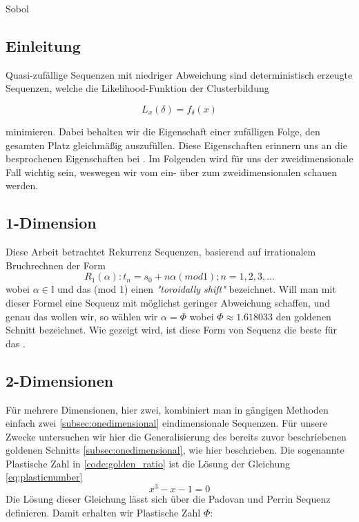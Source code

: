 Sobol \cite{owen1998scrambling} \cite{heitz:hal-02150657} \cite{quasirandomsequencesbyRoberts}

\subsection{Einleitung}
Quasi-zufällige Sequenzen mit niedriger Abweichung sind deterministisch 
erzeugte Sequenzen, welche die Likelihood-Funktion der Clusterbildung

\begin{equation}\label{eq:likelihood}
    L_{x}(\delta) = f_{\delta}(x)
\end{equation}

minimieren. Dabei behalten wir die Eigenschaft einer zufälligen Folge, 
den gesamten Platz gleichmäßig auszufüllen. Diese Eigenschaften erinnern
uns an die besprochenen Eigenschaften bei .
Im Folgenden wird für uns der zweidimensionale Fall wichtig sein, weswegen
wir vom ein- über zum zweidimensionalen schauen werden.

\label{subsec:onedimensional}
\subsection{1-Dimension}
Diese Arbeit betrachtet Rekurrenz Sequenzen, basierend auf irrationalem 
Bruchrechnen der Form
\begin{equation}\label{eq:RekurrenzSequenz}
    R_{1}(\alpha) : t_n = s_0 + n\alpha(mod 1); n = 1,2,3,...
\end{equation}
wobei $\alpha \in \mathbb{I}$ und das (mod 1) einen \textit{"toroidally shift"}
bezeichnet. Will man mit dieser Formel eine Sequenz mit möglichst geringer
Abweichung schaffen, und genau das wollen wir, so wählen wir 
$\alpha = \Phi$ wobei $\Phi \approx 1.618033$ den goldenen Schnitt bezeichnet.
Wie \cite{quasirandomsequencesbyRoberts} gezeigt wird, ist diese Form von 
Sequenz die beste für das .  

\subsection{2-Dimensionen}

Für mehrere Dimensionen, hier zwei, kombiniert man in gängigen Methoden 
einfach zwei \ref{subsec:onedimensional} eindimensionale Sequenzen.
Für unsere Zwecke untersuchen wir hier die Generalisierung des bereits 
zuvor beschriebenen goldenen Schnitts \ref{subsec:onedimensional}, wie
hier \cite{krcadinac2006new} beschrieben. 
Die sogenannte Plastische Zahl in \ref{code:golden_ratio} ist die Lösung der
Gleichung \ref{eq:plasticnumber}
\begin{equation}\label{eq:cubic}
   x^{3} - x - 1 = 0
\end{equation}
Die Lösung dieser Gleichung lässt sich über die Padovan und Perrin Sequenz
definieren. Damit erhalten wir Plastische Zahl $\Phi$:

